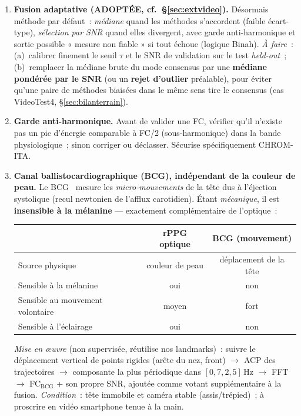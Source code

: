 \documentclass[11pt,a4paper]{article}
\newcommand{\ok}[1]{\textcolor{good}{#1}}
\newcommand{\ko}[1]{\textcolor{bad}{#1}}
\begin{document}
\begin{enumerate}[leftmargin=1.5em]

\item \textbf{Fusion adaptative (ADOPTÉE, cf.~§\ref{sec:extvideo}).} Désormais
méthode par défaut~: \emph{médiane} quand les méthodes s'accordent (faible
écart-type), \emph{sélection par SNR} quand elles divergent, avec garde
anti-harmonique et sortie possible « mesure non fiable » si tout échoue (logique
Binah). \emph{À faire}~: (a)~calibrer finement le seuil $\tau$ et le SNR de
validation sur le test \emph{held-out}~; (b)~remplacer la médiane brute du mode
consensus par une \textbf{médiane pondérée par le SNR} (ou un \textbf{rejet
d'outlier} préalable), pour éviter qu'une paire de méthodes biaisées dans le même
sens tire le consensus (cas VideoTest4, §\ref{sec:bilanterrain}).

\item \textbf{Garde anti-harmonique.} Avant de valider une FC, vérifier qu'il
n'existe pas un pic d'énergie comparable à FC/2 (sous-harmonique) dans la bande
physiologique~; sinon corriger ou déclasser. Sécurise spécifiquement CHROM-ITA.

\item \textbf{Canal ballistocardiographique (BCG), indépendant de la couleur de
peau.} Le BCG~\cite{balakrishnan2013} mesure les \emph{micro-mouvements} de la
tête dus à l'éjection systolique (recul newtonien de l'afflux carotidien). Étant
\emph{mécanique}, il est \textbf{insensible à la mélanine} --- exactement
complémentaire de l'optique~:
\begin{center}
\begin{tabular}{@{}lcc@{}}
\toprule
 & rPPG optique & BCG (mouvement) \\
\midrule
Source physique        & couleur de peau & déplacement de la tête \\
Sensible à la mélanine & \ko{oui} & \ok{non} \\
Sensible au mouvement volontaire & moyen & \ko{fort} \\
Sensible à l'éclairage & \ko{oui} & \ok{non} \\
\bottomrule
\end{tabular}
\end{center}
\emph{Mise en œuvre} (non supervisée, réutilise nos landmarks)~: suivre le
déplacement vertical de points rigides (arête du nez, front) $\rightarrow$ ACP des
trajectoires $\rightarrow$ composante la plus périodique dans $[0{,}7,2{,}5]$\,Hz
$\rightarrow$ FFT $\rightarrow$ FC$_\text{BCG}$ + son propre SNR, ajoutée comme
votant supplémentaire à la fusion. \emph{Condition}~: tête immobile et caméra
stable (assis/trépied)~; à proscrire en vidéo smartphone tenue à la main.


\end{enumerate}
\end{document}
